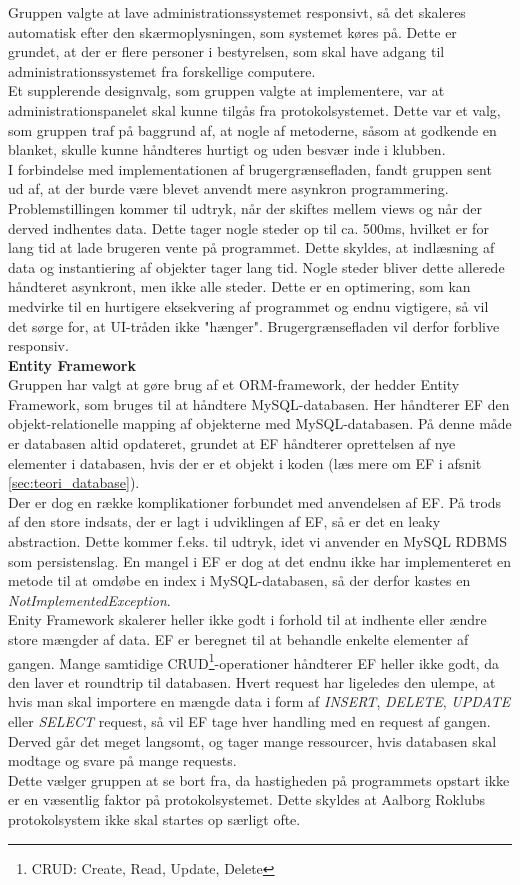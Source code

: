 Gruppen valgte at lave administrationssystemet responsivt, så det skaleres automatisk efter den skærmoplysningen, som systemet køres på. Dette er grundet, at der er flere personer i bestyrelsen, som skal have adgang til administrationssystemet fra forskellige computere. \\

Et supplerende designvalg, som gruppen valgte at implementere, var at administrationspanelet skal kunne tilgås fra protokolsystemet. Dette var et valg, som gruppen traf på baggrund af, at nogle af metoderne, såsom at godkende en blanket, skulle kunne håndteres hurtigt og uden besvær inde i klubben. \\

I forbindelse med implementationen af brugergrænsefladen, fandt gruppen sent ud af, at der burde være blevet anvendt mere asynkron programmering. Problemstillingen kommer til udtryk, når der skiftes mellem views og når der derved indhentes data. Dette tager nogle steder op til ca. 500ms, hvilket er for lang tid at lade brugeren vente på programmet. Dette skyldes, at indlæsning af data og instantiering af objekter tager lang tid. Nogle steder bliver dette allerede håndteret asynkront, men ikke alle steder. Dette er en optimering, som kan medvirke til en hurtigere eksekvering af programmet og endnu vigtigere, så vil det sørge for, at UI-tråden ikke "hænger"\mbox{}. Brugergrænsefladen vil derfor forblive responsiv.\\

\textbf{Entity Framework}\\
Gruppen har valgt at gøre brug af et ORM-framework, der hedder Entity Framework, som bruges til at håndtere MySQL-databasen. Her håndterer EF den objekt-relationelle mapping af objekterne med MySQL-databasen. På denne måde er databasen altid opdateret, grundet at EF håndterer oprettelsen af nye elementer i databasen, hvis der er et objekt i koden (læs mere om EF i afsnit \ref{sec:teori_database}).\\

Der er dog en række komplikationer forbundet med anvendelsen af EF. På trods af den store indsats, der er lagt i udviklingen af EF, så er det en leaky abstraction. Dette kommer f.eks. til udtryk, idet vi anvender en MySQL RDBMS som persistenslag.
En mangel i EF er dog at det endnu ikke har implementeret en metode til at omdøbe en index i MySQL-databasen, så der derfor kastes en \textit{NotImplementedException}.\\

Enity Framework skalerer heller ikke godt i forhold til at indhente eller ændre store mængder af data. EF er beregnet til at behandle enkelte elementer af gangen. Mange samtidige CRUD\footnote{CRUD: Create, Read, Update, Delete}-operationer håndterer EF heller ikke godt, da den laver et roundtrip til databasen. Hvert request har ligeledes den ulempe, at hvis man skal importere en mængde data i form af \textit{INSERT}, \textit{DELETE}, \textit{UPDATE} eller \textit{SELECT} request, så vil EF tage hver handling med en request af gangen. Derved går det meget langsomt, og tager mange ressourcer, hvis databasen skal modtage og svare på mange requests. \\

Dette vælger gruppen at se bort fra, da hastigheden på programmets opstart ikke er en væsentlig faktor på protokolsystemet. Dette skyldes at Aalborg Roklubs protokolsystem ikke skal startes op særligt ofte.
